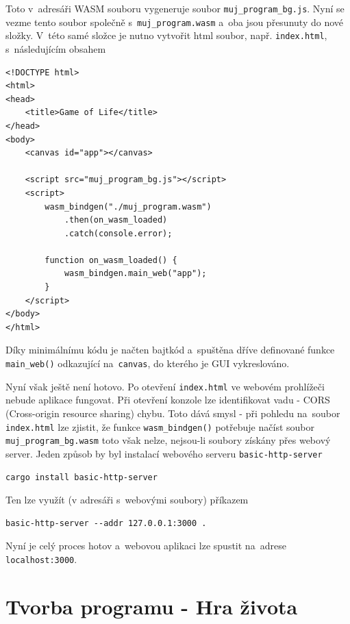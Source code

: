 \documentclass[a4paper, 12pt]{article} %
\newcommand{\rust}[1]{\texttt{#1}}
\begin{document}
        Toto v~adresáři WASM souboru vygeneruje soubor \texttt{muj\_program\_bg.js}. Nyní se vezme tento soubor společně s~\texttt{muj\_program.wasm} a~oba jsou přesunuty do nové složky. V~této samé složce je nutno vytvořit html soubor, např. \texttt{index.html}, s~následujícím obsahem
        \begin{verbatim}
<!DOCTYPE html>
<html>
<head>
    <title>Game of Life</title>
</head>
<body>
    <canvas id="app"></canvas>

    <script src="muj_program_bg.js"></script>
    <script>
        wasm_bindgen("./muj_program.wasm")
            .then(on_wasm_loaded)
            .catch(console.error);

        function on_wasm_loaded() {
            wasm_bindgen.main_web("app");
        }
    </script>
</body>
</html>
        \end{verbatim}
        
        Díky minimálnímu kódu je načten bajtkód a~spuštěna dříve definované funkce \rust{main_web()} odkazující na~\texttt{canvas}, do kterého je GUI vykreslováno.
        
        Nyní však ještě není hotovo. Po otevření \texttt{index.html} ve webovém prohlížeči nebude aplikace fungovat. Při otevření konzole lze identifikovat vadu - CORS (Cross-origin resource sharing) chybu. Toto dává smysl - při pohledu na~soubor \texttt{index.html} lze zjistit, že funkce \rust{wasm_bindgen()} potřebuje načíst soubor \texttt{muj\_program\_bg.wasm} toto však nelze, nejsou-li soubory získány přes webový server. Jeden způsob by byl instalací webového serveru \texttt{basic-http-server}
        \begin{verbatim}
cargo install basic-http-server
        \end{verbatim}
        
        Ten lze využít (v adresáři s~webovými soubory) příkazem
        \begin{verbatim}
basic-http-server --addr 127.0.0.1:3000 .
        \end{verbatim}
        
        Nyní je celý proces hotov a~webovou aplikaci lze spustit na~adrese \linebreak\texttt{localhost:3000}.\cite{wasm_vid, wasm_gh}


\section{Tvorba programu - Hra života}
\end{document}
